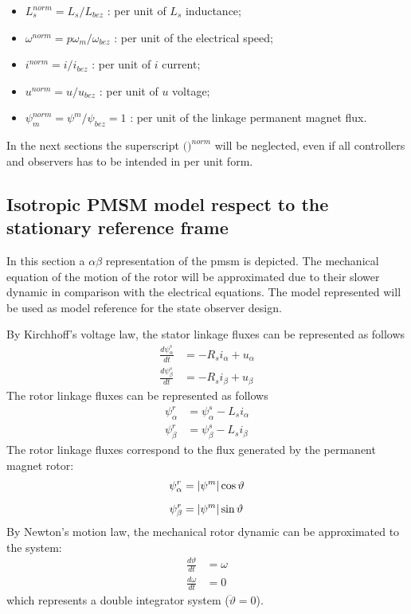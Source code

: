 \documentclass[12pt,a4paper]{scrartcl}
\begin{document}
\begin{onehalfspace}
\begin{itemize}
\begin{itemize}
		\item[--] $L_s^{norm} = L_s/L_{bez}$ : per unit of $L_s$ inductance;
		\item[--] $\omega^{norm} = p\omega_m/\omega_{bez}$ : per unit of the electrical speed;		
		\item[--] $i^{norm} = i/i_{bez}$ : per unit of $i$ current;
		\item[--] $u^{norm} = u/u_{bez}$ : per unit of $u$ voltage;
		\item[--] $\psi_m^{norm} = \psi^m/\psi_{bez} = 1$ : per unit of the linkage permanent magnet flux.
	\end{itemize}	 
\end{itemize}
In the next sections the superscript $\Big(\Big)^{norm}$ will be neglected, even if all controllers and observers has to be intended in per unit form. 

\subsection{Isotropic PMSM model respect to the stationary reference frame}
In this section a $\alpha\beta$ representation of the pmsm is depicted. The mechanical equation of the motion of the rotor will be approximated due to their slower dynamic in comparison with the electrical equations. The model represented will be used as model reference for the state observer design.

By Kirchhoff's voltage law, the stator linkage fluxes can be represented as follows
\begin{align}
	\frac{d\psi_{\alpha}^s}{dt} &= -R_si_{\alpha} + u_{\alpha} \\[6pt]
	\frac{d\psi_{\beta}^s}{dt} &= -R_si_{\beta} + u_{\beta}
\end{align}
The rotor linkage fluxes can be represented as follows
\begin{align}
	\psi_{\alpha}^r &= \psi_{\alpha}^s -L_s i_{\alpha} \\[6pt]
	\psi_{\beta}^r &= \psi_{\beta}^s -L_s i_{\beta}
\end{align}
The rotor linkage fluxes correspond to the flux generated by the permanent magnet rotor:
\begin{align}
	\psi_{\alpha}^r &= \abs{\psi^m}\cos\vartheta \\[6pt]
	\psi_{\beta}^r &= \abs{\psi^m}\sin\vartheta
\end{align}
By Newton's motion law, the mechanical rotor dynamic can be approximated to the system:
\begin{align}
	\frac{d\vartheta}{dt} &= \omega \\[6pt]
	\frac{d\omega}{dt} &= 0
\end{align}
which represents a double integrator system ($\ddot{\vartheta}=0$).


\end{onehalfspace}
\end{document}
